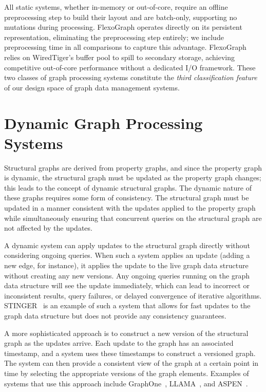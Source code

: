 All static systems, whether in-memory or out-of-core, require an offline preprocessing step to build their layout and are batch-only, supporting no mutations during processing.
FlexoGraph operates directly on its persistent representation, eliminating the preprocessing step entirely; we include preprocessing time in all comparisons to capture this advantage.
FlexoGraph relies on WiredTiger's buffer pool to spill to secondary storage, achieving competitive out-of-core performance without a dedicated I/O framework.
These two classes of graph processing systems constitute the \textit{third classification feature} of our design space of graph data management systems.

\section{Dynamic Graph Processing Systems}
\label{design:dynamic_structural}
Structural graphs are derived from property graphs, and since the property graph is dynamic, the structural graph must be updated as the property graph changes; this leads to the concept of dynamic structural graphs.
The dynamic nature of these graphs requires some form of consistency.
The structural graph must be updated in a manner consistent with the updates applied to the property graph while simultaneously ensuring that concurrent queries on the structural graph are not affected by the updates.

A dynamic system can apply updates to the structural graph directly without considering ongoing queries.
When such a system applies an update (adding a new edge, for instance), it applies the update to the live graph data structure without creating any new versions.
Any ongoing queries running on the graph data structure will see the update immediately, which can lead to incorrect or inconsistent results, query failures, or delayed convergence of iterative algorithms.
STINGER~\cite{stinger2012ediger} is an example of such a system that allows for fast updates to the graph data structure but does not provide any consistency guarantees.

A more sophisticated approach is to construct a new version of the structural graph as the updates arrive.
Each update to the graph has an associated timestamp, and a system uses these timestamps to construct a versioned graph.
The system can then provide a consistent view of the graph at a certain point in time by selecting the appropriate versions of the graph elements.
Examples of systems that use this approach include GraphOne~\cite{graphone2019kumar}, LLAMA~\cite{llama}, and ASPEN~\cite{10.1145/3314221.3314598}.

